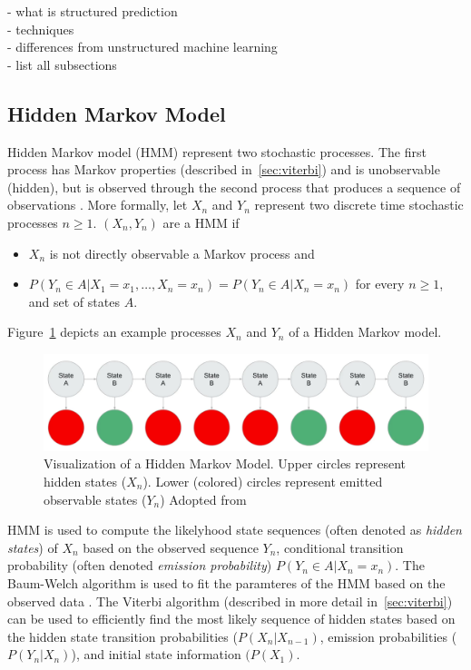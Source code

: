 - what is structured prediction \\
- techniques \\
- differences from unstructured machine learning \\
- list all subsections \\

\subsection{Hidden Markov Model}
\label{sec:hmm}

Hidden Markov model (HMM) represent two stochastic 
processes.  
The first process has Markov properties (described in~\ref{sec:viterbi}) and
is unobservable (hidden), but is observed
through the second process that produces a sequence of
observations \citep{rabiner1986introduction}.
More formally, let 
$X_n$ and $Y_n$ represent two discrete time stochastic processes
$n \geq 1$. $(X_n, Y_n)$ are a HMM if 
\begin{itemize}
\item $X_n$ is not directly observable a Markov process and
\item 
$P(Y_n \in A | X_1 = x_1, \dots, X_n = x_n) = P(Y_n \in A | X_n = x_n)$
		for every $n \geq 1$, and set of states $A$. 
\end{itemize}
Figure~\ref{fig:hmm} depicts an example processes $X_n$ and $Y_n$ of a
Hidden Markov model. 

\begin{figure}
	\includegraphics[scale=0.3]{hmm_example.png}
\caption{Visualization of a Hidden Markov Model. Upper circles represent hidden 
	states ($X_n$). Lower (colored) circles represent emitted observable states ($Y_n$)
	Adopted from \citep{hmm_figure}
	}
\label{fig:hmm}
\end{figure}

HMM is used to compute the likelyhood state sequences (often denoted
as \textit{hidden states}) of $X_n$ based on the 
observed sequence $Y_n$, conditional transition probability (often denoted
\textit{emission probability}) $P(Y_n \in A | X_n = x_n)$.
The Baum-Welch algorithm is used to fit the paramteres of the HMM based on the
observed data \citep{baggenstoss2001modified}. The Viterbi algorithm (described
in more detail in~\ref{sec:viterbi}) can be used to efficiently 
find the most likely sequence of hidden states based on 
the hidden state transition probabilities ($P(X_n | X_{n - 1})$,
emission probabilities ($P(Y_n | X_n)$), and initial state information $(P(X_1)$. 

